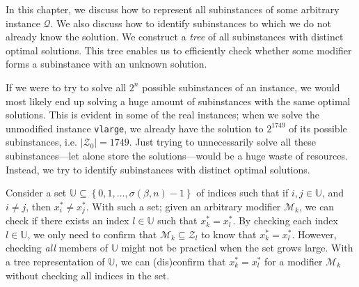 In this chapter, we discuss how to represent all subinstances of some arbitrary
instance $\mathcal{Q}$. We also discuss how to identify 
subinstances to which we do not already know the solution.
We construct a \emph{tree} of all subinstances with distinct optimal solutions.
This tree enables us to efficiently check whether some modifier forms a
subinstance with an unknown solution.

If we were to try to solve all $2^n$ possible subinstances of an
instance, we would most likely end up solving a huge amount of subinstances
with the same optimal solutions. This is evident in some of the real
instances; when we solve the unmodified instance \texttt{vlarge},
we already have the solution to $2^{1749}$ of its possible subinstances, i.e.
$|\mathcal{Z}_0| = 1749$.
Just trying to unnecessarily solve all these subinstances---let alone store the
solutions---would be a huge waste of resources.
Instead, we try to identify subinstances with distinct optimal solutions.
\begin{comment}
A good starting point is to find all the subsets of $\mathcal{N}_0$ and
use them as modifiers of $Q$. This is equivalent to forcing non-zero
variables in the optimal solution of the unchanged instance $Q$, to zero.
Recall from the previous section that if $\mathcal{Q}$ is known, knowing the
modifier $\mathcal{M}_k$ is sufficient to identify the subinstance
$\mathcal{Q}_k$.
While modifiers $\mathcal{M}_k$ such that
$\mathcal{M}_k \subseteq \mathcal{N}_0$ ensures that $x_k^*\neq x_0^*$,
it does not assure us that $x_k^* \neq x_l^*$ for all $l=1,2,\ldots,s-1$.
To make sure that we only solve subinstances with distinct optimal solutions,
we need to identify modifiers $\mathcal{M}_k$ such that
$\mathcal{M}_k \not \subset \mathcal{Z}_l$
for \emph{all} $l=1,2,\ldots,s-1$.
\end{comment}

Consider a set $\mathbb{U}\subseteq \left\{{0,1,\ldots,\sigma(\beta, n)-1}\right\}$ of indices
such that if $i,j \in \mathbb{U}$, and $i \neq j$, then $x_i^* \neq x_j^*$.
With such a set; given an arbitrary modifier $\mathcal{M}_k$, we can check
if there exists an index $l \in \mathbb{U}$ such that $x_k^* = x_l^*$. By
checking each index $l \in \mathbb{U}$, we only need to confirm that
$\mathcal{M}_k \subseteq \mathcal{Z}_l$ to know that $x_k^* = x_l^*$. However,
checking \emph{all} members of $\mathbb{U}$ might not be practical when the set
grows large. With a tree representation of $\mathbb{U}$, we can (dis)confirm
that $x_k^* = x_l^*$ for a modifier $\mathcal{M}_k$ without checking all
indices in the set.

